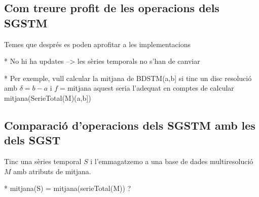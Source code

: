 \subsection{Com treure profit de les operacions dels SGSTM}

Temes que després es poden aprofitar a les implementacions

* No hi ha updates --> les sèries temporals no s'han de canviar

* Per exemple, vull calcular la mitjana de  BDSTM(a,b] si tinc un disc resolució amb $\delta=b-a$ i $f=$mitjana aquest seria l'adequat en comptes de calcular mitjana(SerieTotal(M)(a,b])








\subsection{Comparació d'operacions dels SGSTM amb les dels SGST}

Tinc una sèries temporal $S$ i l'emmagatzemo a una base de dades multiresolució $M$ amb atributs de mitjana. 

* mitjana(S) = mitjana(serieTotal(M)) ?

